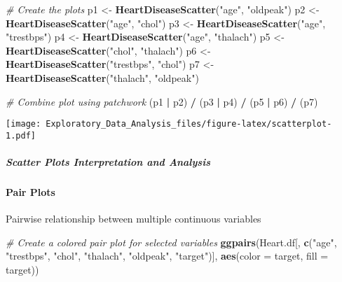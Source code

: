 \documentclass[
]{article}
\newenvironment{Shaded}{\begin{snugshade}}{\end{snugshade}}
\newcommand{\AttributeTok}[1]{\textcolor[rgb]{0.13,0.29,0.53}{#1}}
\newcommand{\CommentTok}[1]{\textcolor[rgb]{0.56,0.35,0.01}{\textit{#1}}}
\newcommand{\FunctionTok}[1]{\textcolor[rgb]{0.13,0.29,0.53}{\textbf{#1}}}
\newcommand{\NormalTok}[1]{#1}
\newcommand{\OtherTok}[1]{\textcolor[rgb]{0.56,0.35,0.01}{#1}}
\newcommand{\SpecialCharTok}[1]{\textcolor[rgb]{0.81,0.36,0.00}{\textbf{#1}}}
\newcommand{\StringTok}[1]{\textcolor[rgb]{0.31,0.60,0.02}{#1}}
\begin{document}
\begin{Shaded}
\begin{Highlighting}[]
\CommentTok{\# Create the plots}
\NormalTok{p1 }\OtherTok{\textless{}{-}} \FunctionTok{HeartDiseaseScatter}\NormalTok{(}\StringTok{"age"}\NormalTok{, }\StringTok{"oldpeak"}\NormalTok{)}
\NormalTok{p2 }\OtherTok{\textless{}{-}} \FunctionTok{HeartDiseaseScatter}\NormalTok{(}\StringTok{"age"}\NormalTok{, }\StringTok{"chol"}\NormalTok{)}
\NormalTok{p3 }\OtherTok{\textless{}{-}} \FunctionTok{HeartDiseaseScatter}\NormalTok{(}\StringTok{"age"}\NormalTok{, }\StringTok{"trestbps"}\NormalTok{)}
\NormalTok{p4 }\OtherTok{\textless{}{-}} \FunctionTok{HeartDiseaseScatter}\NormalTok{(}\StringTok{"age"}\NormalTok{, }\StringTok{"thalach"}\NormalTok{)}
\NormalTok{p5 }\OtherTok{\textless{}{-}} \FunctionTok{HeartDiseaseScatter}\NormalTok{(}\StringTok{"chol"}\NormalTok{, }\StringTok{"thalach"}\NormalTok{)}
\NormalTok{p6 }\OtherTok{\textless{}{-}} \FunctionTok{HeartDiseaseScatter}\NormalTok{(}\StringTok{"trestbps"}\NormalTok{, }\StringTok{"chol"}\NormalTok{)}
\NormalTok{p7 }\OtherTok{\textless{}{-}} \FunctionTok{HeartDiseaseScatter}\NormalTok{(}\StringTok{"thalach"}\NormalTok{, }\StringTok{"oldpeak"}\NormalTok{)}

\CommentTok{\# Combine plot using patchwork}
\NormalTok{(p1 }\SpecialCharTok{|}\NormalTok{ p2) }\SpecialCharTok{/}
\NormalTok{(p3 }\SpecialCharTok{|}\NormalTok{ p4) }\SpecialCharTok{/}
\NormalTok{(p5 }\SpecialCharTok{|}\NormalTok{ p6) }\SpecialCharTok{/}
\NormalTok{(p7)}
\end{Highlighting}
\end{Shaded}

\texttt{[image: Exploratory\_Data\_Analysis\_files/figure-latex/scatterplot-1.pdf]}

\subparagraph{\texorpdfstring{\textbf{Scatter Plots Interpretation and
Analysis}}{Scatter Plots Interpretation and Analysis}}\label{scatter-plots-interpretation-and-analysis}

\paragraph{\texorpdfstring{\textbf{Pair
Plots}}{Pair Plots}}\label{pair-plots}

Pairwise relationship between multiple continuous variables

\begin{Shaded}
\begin{Highlighting}[]
\CommentTok{\# Create a colored pair plot for selected variables}
\FunctionTok{ggpairs}\NormalTok{(Heart.df[, }\FunctionTok{c}\NormalTok{(}\StringTok{"age"}\NormalTok{, }\StringTok{"trestbps"}\NormalTok{, }\StringTok{"chol"}\NormalTok{, }
                     \StringTok{"thalach"}\NormalTok{, }\StringTok{"oldpeak"}\NormalTok{, }\StringTok{"target"}\NormalTok{)], }
        \FunctionTok{aes}\NormalTok{(}\AttributeTok{color =}\NormalTok{ target, }\AttributeTok{fill =}\NormalTok{ target))}
\end{Highlighting}
\end{Shaded}
\end{document}

